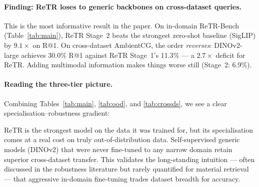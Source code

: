 \documentclass[10pt,twocolumn]{article}
\begin{document}
\paragraph{Finding: ReTR loses to generic backbones on cross-dataset queries.}
This is the most informative result in the paper.
On in-domain ReTR-Bench (Table~\ref{tab:main}), ReTR Stage~2 beats the
strongest zero-shot baseline (SigLIP) by $9.1\times$ on R@1.
On cross-dataset AmbientCG, the order \emph{reverses}: DINOv2-large achieves
30.0\% R@1 against ReTR Stage~1's 11.3\% --- a $2.7\times$ deficit for ReTR.
Adding multimodal information makes things worse still (Stage~2: 6.9\%).

\paragraph{Reading the three-tier picture.}
Combining Tables~\ref{tab:main}, \ref{tab:ood}, and \ref{tab:crossds}, we see
a clear specialisation--robustness gradient:

\begin{table}[h]
\centering
\caption{Three-tier generalisation summary (R@1 in \%; rank within method
         class).}
\label{tab:three-tier}
\end{table}

ReTR is the strongest model on the data it was trained for, but its
specialisation comes at a real cost on truly out-of-distribution data.
Self-supervised generic models (DINOv2) that were never fine-tuned to any
narrow domain retain superior cross-dataset transfer.
This validates the long-standing intuition --- often discussed in the
robustness literature but rarely quantified for material retrieval ---
that aggressive in-domain fine-tuning trades dataset breadth for accuracy.
\end{document}
